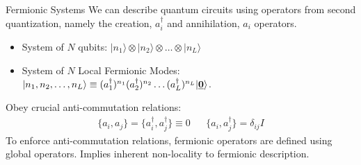 \begin{frame}{Fermionic Systems}
    We can describe quantum circuits using operators from second quantization, namely the creation, $a_i^{\dagger}$ and annihilation, $a_i$ operators.

    \begin{itemize}
        \item System of $N$ qubits: $|n_1\rangle \otimes |n_2\rangle \otimes \dots \otimes |n_L\rangle$
        \item System of $N$ Local Fermionic Modes: $|n_1, n_2, \dots, n_L \rangle \equiv (a_1^{\dagger})^{n_1}(a_2^{\dagger})^{n_2} \dots (a_L^{\dagger})^{n_L} |\underline{\bf{0}}\rangle$.
    \end{itemize}





    Obey crucial anti-commutation relations:
    \begin{align*}
        \{a_i, a_j\} = \{a_i^{\dagger}, a_j^{\dagger}\} \equiv 0 && \{a_i, a^{\dagger}_j\} = \delta_{ij} I
    \end{align*}
    To enforce anti-commutation relations, fermionic operators are defined using global operators. Implies inherent non-locality to fermionic description.
    
 
\end{frame}
